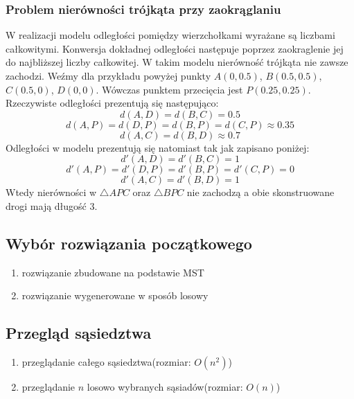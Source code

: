 \documentclass{article}
\begin{document}
\begin{figure}[h!]
\begin{subfigure}{0.5\textwidth}
    \end{subfigure}
\end{figure}

\newpage

\subsubsection{Problem nierówności trójkąta przy zaokrąglaniu}
W realizacji modelu odległości pomiędzy wierzchołkami wyrażane są liczbami całkowitymi. 
Konwersja dokładnej odległości następuje poprzez zaokraglenie jej do najbliższej liczby całkowitej.
W takim modelu nierówność trójkąta nie zawsze zachodzi. 
Weźmy dla przykładu powyżej punkty $A(0, 0.5)$, $B(0.5, 0.5)$, $C(0.5, 0)$, $D(0, 0)$. Wówczas punktem przecięcia jest $P(0.25, 0.25)$.
Rzeczywiste odległości prezentują się następująco: 
\[ d(A, D) = d(B, C) = 0.5 \]
\[ d(A, P) = d(D, P) = d(B, P) = d(C, P) \approx 0.35 \]
\[ d(A, C) = d(B, D) \approx 0.7 \]
Odległości w modelu prezentują się natomiast tak jak zapisano poniżej:
\[ d'(A, D) = d'(B, C) = 1 \]
\[ d'(A, P) = d'(D, P) = d'(B, P) = d'(C, P) = 0 \]
\[ d'(A, C) = d'(B, D) = 1 \]
Wtedy nierówności w $\triangle APC$ oraz $\triangle BPC$ nie zachodzą a obie skonstruowane drogi mają długość 3.

\subsection{Wybór rozwiązania początkowego}
\begin{enumerate}
    \item rozwiązanie zbudowane na podstawie MST
    \item rozwiązanie wygenerowane w sposób losowy
\end{enumerate}

\subsection{Przegląd sąsiedztwa}
\begin{enumerate}
    \item przeglądanie całego sąsiedztwa(rozmiar: $O(n^2)$)
    \item przeglądanie $n$ losowo wybranych sąsiadów(rozmiar: $O(n)$)
\end{enumerate}
\end{document}
